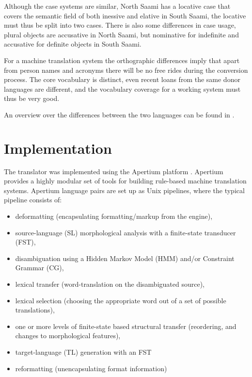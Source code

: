 \documentclass[a4paper,11pt,twocolumn]{article}
\begin{document}
Although the case systems are similar, North Saami has a locative case
that covers the semantic field of both inessive and elative in 
South Saami, the locative must thus be split into two cases. There is
also some differences in case usage, plural objects are accusative
in North Saami, but nominative for indefinite and accusative for 
definite objects in South Saami.

For a machine translation system the orthographic differences imply
that apart from person names and acronyms there will be no free rides
during the conversion process. The core vocabulary is distinct, even
recent loans from the same donor languages are different, and the
vocabulary coverage for a working system must thus be very good.

An overview over the differences between the two languages can
be found in \cite{sammallahti98}.



\section{Implementation}

The translator was implemented using the Apertium platform \cite{forcada2011}. Apertium 
provides a highly modular set of tools for building rule-based
machine translation systems. Apertium language pairs are set up as Unix pipelines, where the
typical pipeline consists of:

\begin{itemize}
\item deformatting (encapsulating formatting/markup from the engine),
\item source-language (SL) morphological analysis with a finite-state
  transducer (FST),
\item disambiguation using a Hidden Markov Model (HMM) and/or
  Constraint Grammar (CG), 
\item lexical transfer (word-translation on the disambiguated source),
\item lexical selection (choosing the appropriate word out of a set of possible
   translations),
\item one or more levels of finite-state based structural transfer
  (reordering, and changes to morphological features),
\item target-language (TL) generation with an FST
\item reformatting (unencapsulating format information)
\end{itemize}
\end{document}
